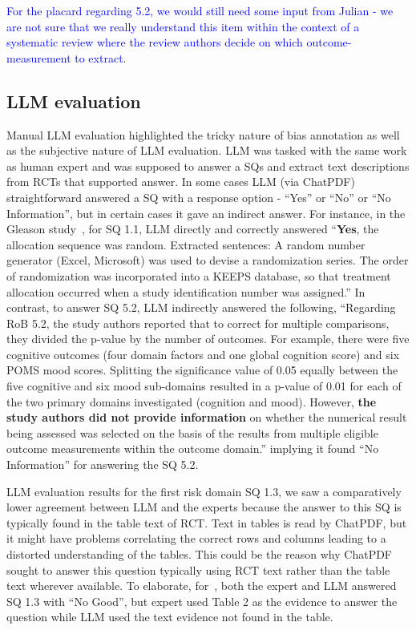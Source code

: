 \documentclass[sn-mathphys,Numbered]{sn-jnl}%
\theoremstyle{thmstyleone}%
\theoremstyle{thmstyletwo}%
\theoremstyle{thmstylethree}%
\begin{document}
\textcolor{blue}{For the placard regarding 5.2, we would still need some input from Julian - we are not sure that we really understand this item within the context of a systematic review where the review authors decide on which outcome-measurement to extract. }
%
%
%
\subsection{LLM evaluation}
\label{disc:llm}
%
Manual LLM evaluation highlighted the tricky nature of bias annotation as well as the subjective nature of LLM evaluation.
LLM was tasked with the same work as human expert and was supposed to answer a SQs and extract text descriptions from RCTs that supported answer.
In some cases LLM (via ChatPDF) straightforward answered a SQ with a response option - ``Yes'' or ``No'' or ``No Information'', but in certain cases it gave an indirect answer.
For instance, in the Gleason study~\cite{gleason2015effects}, for SQ 1.1, LLM directly and correctly answered ``\textbf{Yes}, the allocation sequence was random. Extracted sentences: A random number generator (Excel, Microsoft) was used to devise a randomization series. The order of randomization was incorporated into a KEEPS database, so that treatment allocation occurred when a study identification number was assigned.''
In contrast, to answer SQ 5.2, LLM indirectly answered the following, ``Regarding RoB 5.2, the study authors reported that to correct for multiple comparisons, they divided the p-value by the number of outcomes. For example, there were five cognitive outcomes (four domain factors and one global cognition score) and six POMS mood scores. Splitting the significance value of 0.05 equally between the five cognitive and six mood sub-domains resulted in a p-value of 0.01 for each of the two primary domains investigated (cognition and mood). However, \textbf{the study authors did not provide information} on whether the numerical result being assessed was selected on the basis of the results from multiple eligible outcome measurements within the outcome domain.'' implying it found ``No Information'' for answering the SQ 5.2.


LLM evaluation results for the first risk domain SQ 1.3, we saw a comparatively lower agreement between LLM and the experts because the answer to this SQ is typically found in the table text of RCT.
Text in tables is read by ChatPDF, but it might have problems correlating the correct rows and columns leading to a distorted understanding of the tables.
This could be the reason why ChatPDF sought to answer this question typically using RCT text rather than the table text wherever available.
To elaborate, for~\cite{stuck2015effect}, both the expert and LLM answered SQ 1.3 with ``No Good'', but expert used Table 2 as the evidence to answer the question while LLM used the text evidence not found in the table.
\end{document}
